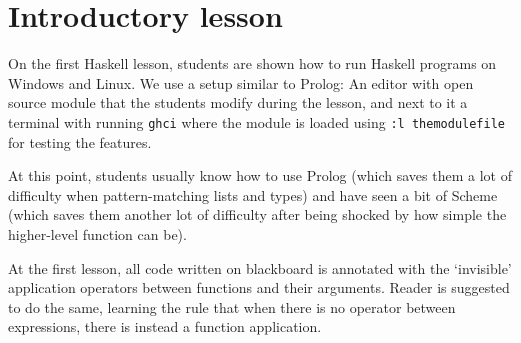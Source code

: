 \section{Introductory lesson}

On the first Haskell lesson, students are shown how to run Haskell programs on
Windows and Linux. We use a setup similar to Prolog: An editor with open source
module that the students modify during the lesson, and next to it a terminal
with running \texttt{ghci} where the module is loaded using
\texttt{:l~themodulefile} for testing the features.

At this point, students usually know how to use Prolog (which saves them a lot
of difficulty when pattern-matching lists and types) and have seen a bit of
Scheme (which saves them another lot of difficulty after being shocked by how
simple the higher-level function can be).

At the first lesson, all code written on blackboard is annotated with the
`invisible' application operators between functions and their arguments. Reader
is suggested to do the same, learning the rule that when there is no operator
between expressions, there is instead a function application.
